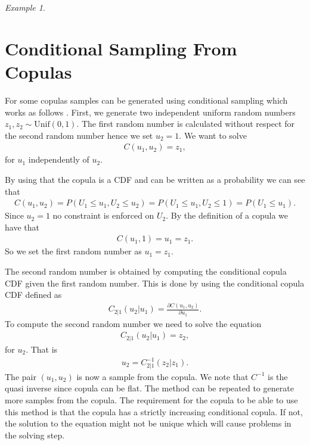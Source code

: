 \documentclass[%
a4paper,							
11pt,								
bibliography=totoc,						
abstracton=true					
]
{scrartcl}
\theoremstyle{plain}
\theoremstyle{definition}
\theoremstyle{remark}
\newtheorem{example}[theorem]{Example}
\newcommand{\1}{\mathbbm{1}}
\begin{document}
\begin{example}

\end{example}


\section{Conditional Sampling From Copulas}\label{sec:ConditionalSampling} 
For some copulas samples can be generated using conditional sampling which works as follows . First, we generate two independent uniform random numbers $z_1,z_2 \sim \mathrm{Unif}(0,1)$. 
The first random number is calculated without respect for the second random number hence we set $u_2 =1$. We want to solve
\begin{align*}
    C(u_1,u_2) =z_1,
\end{align*}
for $u_1$ independently of $u_2$. 

By using that the copula is a \gls{CDF} and can be written as a probability we can see that 
\begin{align*}
    C(u_1,u_2) = P(U_1\leq u_1, U_2\leq u_2) = P(U_1\leq u_1,U_2 \leq 1) = P(U_1\leq u_1).
\end{align*} 
Since $u_2 = 1$ no constraint is enforced on $U_2$. By the definition of a copula we have that 
\begin{align*}
    C(u_1,1) = u_1 = z_1.
\end{align*}
So we set the first random number as $u_1 = z_1$.

The second random number is obtained by computing the conditional copula \gls{CDF} given the first random number. This is done by using the conditional copula \gls{CDF} defined as
\begin{align*}
    C_{2|1}(u_2|u_1) = \frac{\partial C(u_1,u_2)}{\partial u_1}.
\end{align*}
To compute the second random number we need to solve the equation
\begin{align*}
    C_{2|1}(u_2|u_1) = z_2,
\end{align*}
for $u_2$. That is
\begin{align*}
    u_2 = C^{-1}_{2|1}(z_2|z_1).
\end{align*}
The pair $(u_1,u_2)$ is now a sample from the copula. We note that $C^{-1}$ is the quasi inverse since copula can be flat. The method can be repeated to generate more samples from the copula. The requirement for the copula to be able to use this method is that the copula has a strictly increasing conditional copula. If not, the solution to the equation might not be unique which will cause problems in the solving step. 
\end{document}
